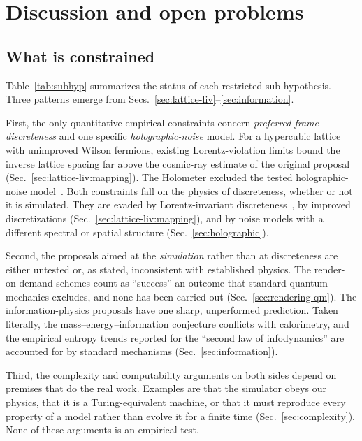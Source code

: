 \section{Discussion and open problems}
\label{sec:discussion}

\subsection{What is constrained}
\label{sec:discussion:synthesis}

Table~\ref{tab:subhyp} summarizes the status of each restricted sub-hypothesis. Three patterns emerge from Secs.~\ref{sec:lattice-liv}--\ref{sec:information}.

First, the only quantitative empirical constraints concern \emph{preferred-frame discreteness} and one specific \emph{holographic-noise} model. For a hypercubic lattice with unimproved Wilson fermions, existing Lorentz-violation limits bound the inverse lattice spacing far above the cosmic-ray estimate of the original proposal (Sec.~\ref{sec:lattice-liv:mapping}). The Holometer excluded the tested holographic-noise model~\cite{Chou2016first}. Both constraints fall on the physics of discreteness, whether or not it is simulated. They are evaded by Lorentz-invariant discreteness~\cite{Dowker2004quantum}, by improved discretizations (Sec.~\ref{sec:lattice-liv:mapping}), and by noise models with a different spectral or spatial structure (Sec.~\ref{sec:holographic}).

Second, the proposals aimed at the \emph{simulation} rather than at discreteness are either untested or, as stated, inconsistent with established physics. The render-on-demand schemes count as ``success'' an outcome that standard quantum mechanics excludes, and none has been carried out (Sec.~\ref{sec:rendering-qm}). The information-physics proposals have one sharp, unperformed prediction. Taken literally, the mass--energy--information conjecture conflicts with calorimetry, and the empirical entropy trends reported for the ``second law of infodynamics'' are accounted for by standard mechanisms (Sec.~\ref{sec:information}).

Third, the complexity and computability arguments on both sides depend on premises that do the real work. Examples are that the simulator obeys our physics, that it is a Turing-equivalent machine, or that it must reproduce every property of a model rather than evolve it for a finite time (Sec.~\ref{sec:complexity}). None of these arguments is an empirical test.

